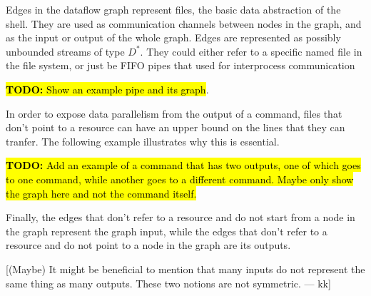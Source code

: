 \documentclass[sigplan,10pt,review,anonymous]{acmart}
\newcommand{\TODO}[1]{\hl{\textbf{TODO:} #1}\xspace}
\newcommand{\kk}[1]{[{\color{magenta}#1 --- kk}]}
\newcommand{\tr}[1]{} %
\newcommand{\kstar}{^{\textstyle *}}
\begin{document}
Edges in the dataflow graph represent files, the basic data
abstraction of the shell. They are used as communication channels
between nodes in the graph, and as the input or output of the whole
graph. Edges are represented as possibly unbounded streams of type
$D\kstar$. They could either refer to a specific named file in the file
system, or just be FIFO pipes that used for interprocess communication

\TODO{Show an example pipe and its graph}.

\begin{center}
\small
{}
\end{center}


In order to expose data parallelism from the output of a command,
files that don't point to a resource can have an upper bound on the
lines that they can tranfer. The following example illustrates why
this is essential.

\TODO{Add an example of a command that has two outputs, one of which
  goes to one command, while another goes to a different
  command. Maybe only show the graph here and not the command itself.}


\tr{On the other hand, some forms of data parallelism can be exposed
  when knowing the size of the input files. As mentioned in \ref{}
  some pure commands (such as cat -n) only need line information to
  become stateless, and knowing the size of a file could allow the
  system to split it in different chunks that can be processed
  independently. To account for that, edges that refer to an input
  resource contain the number of lines of the file that they refer
  to.}

Finally, the edges that don't refer to a resource and do not start
from a node in the graph represent the graph input, while the edges
that don't refer to a resource and do not point to a node in the graph
are its outputs.

\kk{(Maybe) It might be beneficial to mention that many inputs do not
  represent the same thing as many outputs. These two notions are not
  symmetric.}
  
\end{document}

